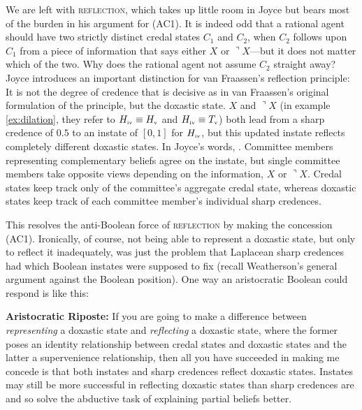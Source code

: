 \documentclass[12pt]{article}
\begin{document}
We are left with \textsc{reflection}, which takes up little room in
Joyce but bears most of the burden in his argument for (AC1). It is
indeed odd that a rational agent should have two strictly distinct
credal states $C_{1}$ and $C_{2}$, when $C_{2}$ follows upon $C_{1}$
from a piece of information that says either $X$ or
$\urcorner{}X$---but it does not matter which of the two. Why does the
rational agent not assume $C_{2}$ straight away? Joyce introduces an
important distinction for van Fraassen's reflection principle: It is
not the degree of credence that is decisive as in van Fraassen's
original formulation of the principle, but the doxastic state. $X$ and
$\urcorner{}X$ (in example \ref{ex:dilation}, they refer to
$H_{\mbox{\tiny{iv}}}\equiv{}H_{\mbox{\tiny{v}}}$ and
$H_{\mbox{\tiny{iv}}}\equiv{}T_{\mbox{\tiny{v}}}$) both lead from a
sharp credence of $0.5$ to an instate of $[0,1]$ for
$H_{\mbox{\tiny{iv}}}$, but this updated instate reflects completely
different doxastic states. In Joyce's words, 
. Committee members representing complementary
beliefs agree on the instate, but single committee members take
opposite views depending on the information, $X$ or $\urcorner{}X$.
Credal states keep track only of the committee's aggregate credal
state, whereas doxastic states keep track of each committee member's
individual sharp credences.

This resolves the anti-Boolean force of \textsc{reflection} by making
the concession (AC1). Ironically, of course, not being able to
represent a doxastic state, but only to reflect it inadequately, was
just the problem that Laplacean sharp credences had which Boolean
instates were supposed to fix (recall Weatherson's general argument
against the Boolean position). One way an aristocratic Boolean could
respond is like this:

\begin{quotex}
  \textbf{Aristocratic Riposte:} If you are going to make a difference
  between \emph{representing} a doxastic state and \emph{reflecting} a
  doxastic state, where the former poses an identity relationship
  between credal states and doxastic states and the latter a
  supervenience relationship, then all you have succeeded in making me
  concede is that both instates and sharp credences reflect doxastic
  states. Instates may still be more successful in reflecting doxastic
  states than sharp credences are and so solve the abductive task of
  explaining partial beliefs better.
\end{quotex}
\end{document}
